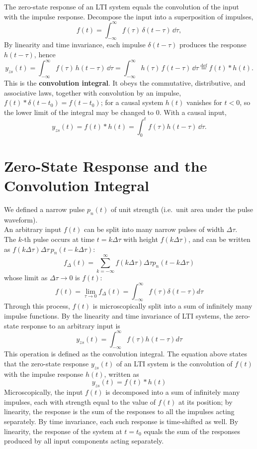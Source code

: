 The zero-state response of an LTI system equals the convolution of the input
with the impulse response. Decompose the input into a superposition of
impulses,
\[
    f(t)=\int_{-\infty}^{\infty}f(\tau)\,\delta(t-\tau)\,\dd\tau ,
\]
By linearity and time invariance, each impulse $\delta(t-\tau)$ produces the
response $h(t-\tau)$, hence
\begin{equation}
    y_{zs}(t)=\int_{-\infty}^{\infty}f(\tau)\,h(t-\tau)\,\dd\tau
            =\int_{-\infty}^{\infty}h(\tau)\,f(t-\tau)\,\dd\tau
            \overset{\mathrm{def}}{=}f(t)*h(t).
\end{equation}
This is the \textbf{convolution integral}. It obeys the commutative,
distributive, and associative laws, together with convolution by an impulse,
$f(t)*\delta(t-t_0)=f(t-t_0)$; for a causal system $h(t)$ vanishes for $t<0$,
so the lower limit of the integral may be changed to $0$. With a causal input,
\[
    y_{zs}(t)=f(t)*h(t)=\int_{0}^{t}f(\tau)h(t-\tau)\,\dd\tau .
\]

\section{Zero-State Response and the Convolution Integral}
We defined a narrow pulse $p_n(t)$ of unit strength (i.e.\ unit area under the
pulse waveform).
\\
An arbitrary input $f(t)$ can be split into many narrow pulses of width
$\Delta \tau$.
\\
The $k$-th pulse occurs at time $t=k\Delta\tau$ with height $f(k\Delta\tau)$,
and can be written as $f(k\Delta \tau)\Delta \tau\, p_n(t-k\Delta \tau)$:
\begin{equation}
    f_{\Delta}(t)=\sum_{k=-\infty}^{\infty}f(k\Delta \tau)\Delta \tau p_n(t-k\Delta \tau)
\end{equation}
whose limit as $\Delta \tau \rightarrow 0$ is $f(t)$:
\begin{equation}
    f(t)=\lim_{\tau \rightarrow 0}f_{\Delta}(t)=\int_{-\infty}^{\infty}f(\tau)\delta(t-\tau)d\tau
\end{equation}
Through this process, $f(t)$ is microscopically split into a sum of
infinitely many impulse functions. By the linearity and time invariance of
LTI systems, the zero-state response to an arbitrary input is
\begin{equation}
    y_{zs}(t)=\int_{-\infty}^{\infty}f(\tau)h(t-\tau)d\tau
\end{equation}
This operation is defined as the convolution integral. The equation above
states that the zero-state response $y_{zs}(t)$ of an LTI system is the
convolution of $f(t)$ with the impulse response $h(t)$, written as
\begin{equation}
    y_{zs}(t)=f(t)* h(t)
\end{equation}
Microscopically, the input $f(t)$ is decomposed into a sum of infinitely many
impulses, each with strength equal to the value of $f(t)$ at its position; by
linearity, the response is the sum of the responses to all the impulses acting
separately.
By time invariance, each such response is time-shifted as well. By linearity,
the response of the system at $t=t_0$ equals the sum of the responses produced
by all input components acting separately.

